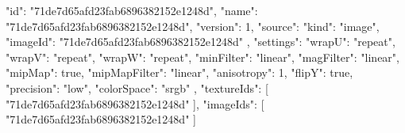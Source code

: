 {
  "id": "71de7d65afd23fab6896382152e1248d",
  "name": "71de7d65afd23fab6896382152e1248d",
  "version": 1,
  "source": {
    "kind": "image",
    "imageId": "71de7d65afd23fab6896382152e1248d"
  },
  "settings": {
    "wrapU": "repeat",
    "wrapV": "repeat",
    "wrapW": "repeat",
    "minFilter": "linear",
    "magFilter": "linear",
    "mipMap": true,
    "mipMapFilter": "linear",
    "anisotropy": 1,
    "flipY": true,
    "precision": "low",
    "colorSpace": "srgb"
  },
  "textureIds": [
    "71de7d65afd23fab6896382152e1248d"
  ],
  "imageIds": [
    "71de7d65afd23fab6896382152e1248d"
  ]
}
